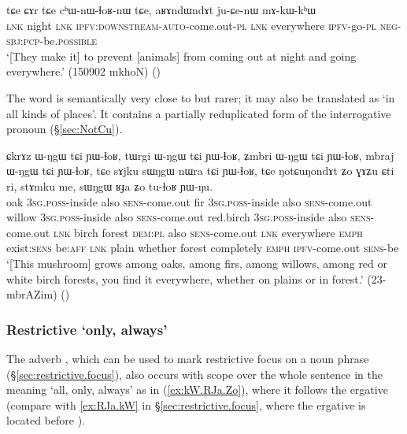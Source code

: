 \begin{exe}
\ex \label{ex:aRAndWndAt.juCenW}
\gll tɕe ɕɤr tɕe cʰɯ-nɯ-ɬoʁ-nɯ tɕe, aʁɤndɯndɤt ju-ɕe-nɯ mɤ-kɯ-kʰɯ \\
\textsc{lnk} night \textsc{lnk} \textsc{ipfv}:\textsc{downstream}-\textsc{auto}-come.out-\textsc{pl} \textsc{lnk} everywhere \textsc{ipfv}-go-\textsc{pl} \textsc{neg}-\textsc{sbj}:\textsc{pcp}-be.\textsc{possible} \\
\glt `[They make it] to prevent [animals] from coming out at night and going everywhere.' (150902 mkhoN)
()
\end{exe} 

The word   is semantically very close to  but rarer; it may also be translated as `in all kinds of places'. It contains a partially reduplicated form of the interrogative pronoun  (§\ref{sec:NotCu}).

 \begin{exe}
\ex \label{ex:NotCuNondAt}
\gll ɕkrɤz ɯ-ŋgɯ tɕi ɲɯ-ɬoʁ, tɯrgi ɯ-ŋgɯ tɕi ɲɯ-ɬoʁ, ʑmbri ɯ-ŋgɯ tɕi ɲɯ-ɬoʁ,  mbraj ɯ-ŋgɯ tɕi ɲɯ-ɬoʁ, tɕe sɤjku sɯŋgɯ nɯra tɕi ɲɯ-ɬoʁ, tɕe ŋotɕuŋondɤt ʑo ɣɤʑu ɕti ri, stɤmku me, sɯŋgɯ ʁɟa ʑo tu-ɬoʁ ɲɯ-ŋu. \\
oak \textsc{3sg}.\textsc{poss}-inside also \textsc{sens}-come.out fir \textsc{3sg}.\textsc{poss}-inside also \textsc{sens}-come.out willow \textsc{3sg}.\textsc{poss}-inside also \textsc{sens}-come.out red.birch \textsc{3sg}.\textsc{poss}-inside also \textsc{sens}-come.out \textsc{lnk} birch  forest \textsc{dem}:\textsc{pl} also \textsc{sens}-come.out \textsc{lnk} everywhere \textsc{emph} exist:\textsc{sens} be:\textsc{aff}  \textsc{lnk} plain whether  forest completely \textsc{emph} \textsc{ipfv}-come.out \textsc{sens}-be \\
\glt `[This mushroom] grows among oaks, among firs, among willows, among red or white birch forests, you find it everywhere, whether on plains or in forest.' (23-mbrAZim) 
()
\end{exe} 


\subsubsection{Restrictive `only, always'} \label{sec:restrictive.adverbs}
 The adverb  , which can be used to mark restrictive focus on a noun phrase (§\ref{sec:restrictive.focus}), also occurs with scope over the whole sentence in the meaning `all, only, always' as in (\ref{ex:kW.RJa.Zo}), where it follows the ergative  (compare with \ref{ex:RJa.kW} in §\ref{sec:restrictive.focus}, where the ergative is located before ).

